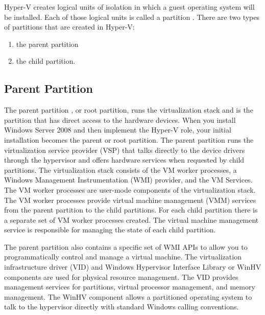 Hyper-V creates logical units of isolation in which a guest operating system will be installed. Each of those logical units is called a partition . There are two types of partitions that are created in Hyper-V:
\begin{enumerate}
	\item the parent partition 
	\item the child partition.
\end{enumerate}

\vspace{5mm}
\subsection{Parent Partition}
\vspace{5mm}

The parent partition \cite{BOOK:1}, or root partition, runs the virtualization stack and is the partition that has direct access to the hardware devices. When you install Windows Server
2008 and then implement the Hyper-V role, your initial installation becomes the parent or root partition. The parent partition runs the virtualization service provider (VSP) that talks
directly to the device drivers through the hypervisor and offers hardware services when requested by child partitions. The virtualization stack consists of the VM worker processes,
a Windows Management Instrumentation (WMI) provider, and the VM Services. The VM worker processes are user-mode components of the virtualization stack.
The VM worker processes provide virtual machine management (VMM) services from the parent partition to the child partitions. For each child partition there is a separate set of VM worker processes created. The virtual machine management service is responsible for managing the state of each child partition.

\vspace{5mm}

The parent partition also contains a specific set of WMI APIs to allow you to programmatically control and manage a virtual machine. The virtualization infrastructure driver
(VID) and Windows Hypervisor Interface Library or WinHV components are used for physical resource management. The VID provides management services for partitions, virtual processor management, and memory management. The WinHV component allows a partitioned operating system to talk to the hypervisor directly with standard Windows calling conventions.

\vspace{5mm}

